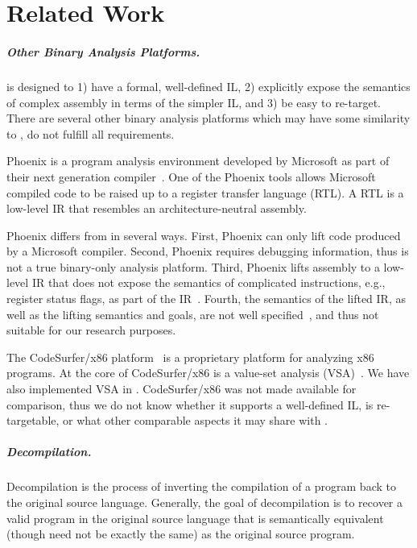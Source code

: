 \chapter{Related Work}
\label{vine:related}

\paragraph{Other Binary Analysis Platforms.} \bap is designed to 1)
have a formal, well-defined IL, 2) explicitly expose the semantics of
complex assembly in terms of the simpler \bap IL, and 3) be easy to
re-target.  There are several other binary analysis platforms which
may have some similarity to \bap, do not fulfill all requirements.

Phoenix is a program analysis environment developed by Microsoft as
part of their next generation compiler~\cite{phoenix}. One of the
Phoenix tools allows Microsoft compiled code to be raised up to a
register transfer language (RTL).  A RTL is a low-level IR that
resembles an architecture-neutral assembly.

Phoenix differs from \bap in several ways. First, Phoenix can only
lift code produced by a Microsoft compiler. Second, Phoenix requires
debugging information, thus is not a true binary-only analysis
platform.  Third, Phoenix lifts assembly to a low-level IR that does
not expose the semantics of complicated instructions, e.g., register
status flags, as part of the IR~\cite{phoenix:noflags}. Fourth, the
semantics of the lifted IR, as well as the lifting semantics and
goals, are not well specified~\cite{phoenix:noflags}, and thus not
suitable for our research purposes.


The CodeSurfer/x86 platform~\cite{balakrishnan:2005} is a proprietary
platform for analyzing x86 programs. At the core of CodeSurfer/x86 is a
value-set analysis (VSA)~\cite{balakrishnan:2007}.  We have also
implemented VSA in \bap.  CodeSurfer/x86 was not made available for
comparison, thus we do not know whether it supports a well-defined IL,
is re-targetable, or what other comparable aspects it may share with \bap.

\paragraph{Decompilation.} Decompilation is the process of inverting
the compilation of a program back to the original source
language. Generally, the goal of decompilation is to recover a valid
program in the original source language that is semantically
equivalent (though need not be exactly the same) as the original
source program.  

